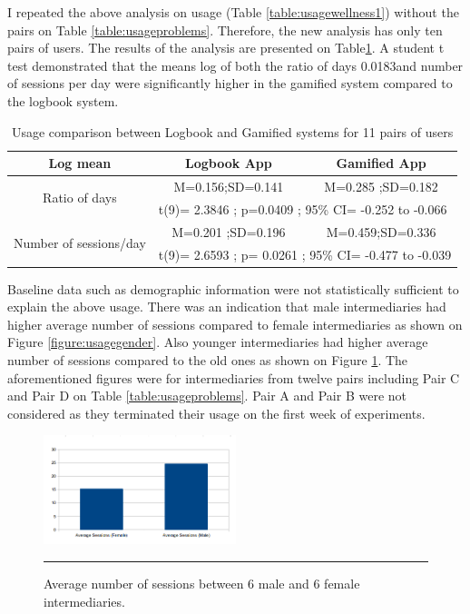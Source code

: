 I repeated the above analysis on usage (Table \ref{table:usagewellness1}) without the pairs on Table \ref{table:usageproblems}. Therefore, the new analysis has only ten pairs of users. The results of the analysis are presented on Table\ref{table:usagewellness2}. A student t test demonstrated that the means log of both  the ratio of days 0.0183and number of sessions per day were significantly higher in the gamified system compared to the logbook system.
\newline 
\begin{table}[h!]
  \begin{center}
    \caption{Usage comparison between Logbook and Gamified systems for 11 pairs of users}
    \label{table:usagewellness2}
	\begin{tabular}{|c|c|c|}
		\hline
		Log mean &Logbook App&Gamified App\\
		\hline
		 \multirow{2}{*}{Ratio of days}&M=0.156;SD=0.141&M=0.285 ;SD=0.182\\\cline{2-3} 

		 &\multicolumn{2}{|l|}{t(9)= 2.3846 ; p=0.0409 ; 95\% CI= -0.252 to -0.066} \\
\hline
   		 \multirow{2}{*}{ Number of sessions/day}&M=0.201 ;SD=0.196&M=0.459;SD=0.336\\\cline{2-3} 
		
		 &\multicolumn{2}{|l|}{t(9)= 2.6593 ; p= 0.0261 ; 95\% CI=  -0.477 to -0.039 } \\
\hline
	\end{tabular}
  \end{center}
\end{table}
\newline  
Baseline data such as demographic information were not statistically sufficient to explain the above usage. There was an indication that male intermediaries had higher average number of sessions compared to female intermediaries as shown on Figure \ref{figure:usagegender}.  Also younger intermediaries had higher average number of sessions compared to the old ones as shown on Figure \ref{figure:usageage}. The aforementioned figures were for intermediaries from twelve pairs including Pair C and Pair D on Table \ref{table:usageproblems}. Pair A and Pair B were not considered as they terminated their usage on the first week of experiments. \newline
\begin{figure}[htbp]
  \centering
    \includegraphics[width=0.5\textwidth]{Figures/session_gender.png}
    \rule{35em}{0.5pt}
  \caption{Average number of sessions between 6 male and 6 female intermediaries.}
  \label{figure:usageage}
\end{figure}
